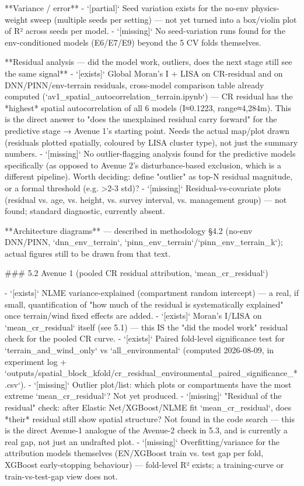 **Variance / error**
- `[partial]` Seed variation exists for the no-env physics-weight sweep (multiple seeds per setting) — not yet turned into a box/violin plot of R² across seeds per model.
- `[missing]` No seed-variation runs found for the env-conditioned models (E6/E7/E9) beyond the 5 CV folds themselves.

**Residual analysis — did the model work, outliers, does the next stage still see the same signal**
- `[exists]` Global Moran's I + LISA on CR-residual and on DNN/PINN/env-terrain residuals, cross-model comparison table already computed (`av1_spatial_autocorrelation_terrain.ipynb`) — CR residual has the *highest* spatial autocorrelation of all 6 models (I≈0.1223, range≈4,284m). This is the direct answer to "does the unexplained residual carry forward" for the predictive stage → Avenue 1's starting point. Needs the actual map/plot drawn (residuals plotted spatially, coloured by LISA cluster type), not just the summary numbers.
- `[missing]` No outlier-flagging analysis found for the predictive models specifically (as opposed to Avenue 2's disturbance-based exclusion, which is a different pipeline). Worth deciding: define "outlier" as top-N residual magnitude, or a formal threshold (e.g. >2-3 std)?
- `[missing]` Residual-vs-covariate plots (residual vs. age, vs. height, vs. survey interval, vs. management group) — not found; standard diagnostic, currently absent.

**Architecture diagrams** — described in methodology §4.2 (no-env DNN/PINN, `dnn_env_terrain`, `pinn_env_terrain`/`pinn_env_terrain_k`); actual figures still to be drawn from that text.

### 5.2 Avenue 1 (pooled CR residual attribution, `mean_cr_residual`)

- `[exists]` NLME variance-explained (compartment random intercept) — a real, if small, quantification of "how much of the residual is systematically explained" once terrain/wind fixed effects are added.
- `[exists]` Moran's I/LISA on `mean_cr_residual` itself (see 5.1) — this IS the "did the model work" residual check for the pooled CR curve.
- `[exists]` Paired fold-level significance test for `terrain_and_wind_only` vs `all_environmental` (computed 2026-08-09, in experiment log + `outputs/spatial_block_kfold/cr_residual_environmental_paired_significance_*.csv`).
- `[missing]` Outlier plot/list: which plots or compartments have the most extreme `mean_cr_residual`? Not yet produced.
- `[missing]` "Residual of the residual" check: after Elastic Net/XGBoost/NLME fit `mean_cr_residual`, does *their* residual still show spatial structure? Not found in the code search — this is the direct Avenue-1 analogue of the Avenue-2 check in 5.3, and is currently a real gap, not just an undrafted plot.
- `[missing]` Overfitting/variance for the attribution models themselves (EN/XGBoost train vs. test gap per fold, XGBoost early-stopping behaviour) — fold-level R² exists; a training-curve or train-vs-test-gap view does not.


